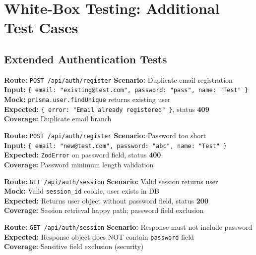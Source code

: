 \documentclass[12pt,a4paper]{report}
\newcommand{\pone}{\textbf{\color{p1red}P1}}
\newcommand{\ptwo}{\textbf{\color{p2orange}P2}}
\begin{document}
\chapter{White-Box Testing: Additional Test Cases}
\section{Extended Authentication Tests}

\begin{tcolorbox}[testbox,title={AUTH-017 \hfill \ptwo}]
\textbf{Route:} \texttt{POST /api/auth/register} \quad \textbf{Scenario:} Duplicate email registration \\
\textbf{Input:} \texttt{\{ email: "existing@test.com", password: "pass", name: "Test" \}} \\
\textbf{Mock:} \texttt{prisma.user.findUnique} returns existing user \\
\textbf{Expected:} \texttt{\{ error: "Email already registered" \}}, status \textbf{409} \\
\textbf{Coverage:} Duplicate email branch
\end{tcolorbox}

\begin{tcolorbox}[testbox,title={AUTH-018 \hfill \ptwo}]
\textbf{Route:} \texttt{POST /api/auth/register} \quad \textbf{Scenario:} Password too short \\
\textbf{Input:} \texttt{\{ email: "new@test.com", password: "abc", name: "Test" \}} \\
\textbf{Expected:} \texttt{ZodError} on password field, status \textbf{400} \\
\textbf{Coverage:} Password minimum length validation
\end{tcolorbox}

\begin{tcolorbox}[testbox,title={AUTH-019 \hfill \pone}]
\textbf{Route:} \texttt{GET /api/auth/session} \quad \textbf{Scenario:} Valid session returns user \\
\textbf{Mock:} Valid \texttt{session\_id} cookie, user exists in DB \\
\textbf{Expected:} Returns user object without password field, status \textbf{200} \\
\textbf{Coverage:} Session retrieval happy path; password field exclusion
\end{tcolorbox}

\begin{tcolorbox}[criticalbox,title={AUTH-020 \hfill \pone\ --- Password Not Exposed}]
\textbf{Route:} \texttt{GET /api/auth/session} \quad \textbf{Scenario:} Response must not include password \\
\textbf{Expected:} Response object does NOT contain \texttt{password} field \\
\textbf{Coverage:} Sensitive field exclusion (security)
\end{tcolorbox}
\end{document}
